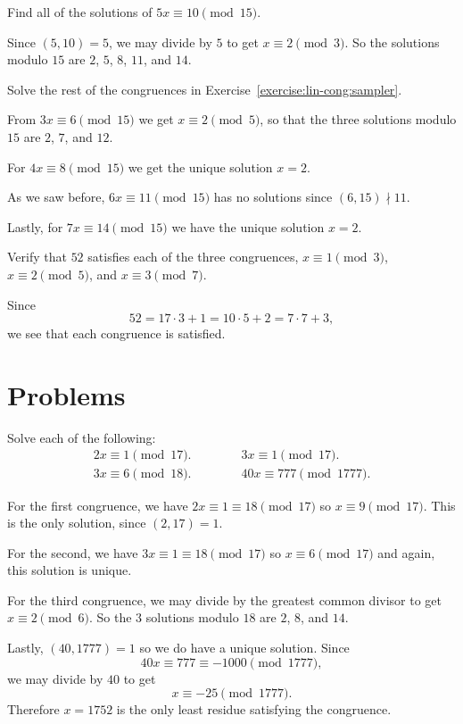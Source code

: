  Find all of the solutions of $5x\equiv10\pmod{15}$.
\begin{solution}
  Since $(5,10) = 5$, we may divide by $5$ to get $x\equiv2\pmod3$. So
  the solutions modulo $15$ are $2$, $5$, $8$, $11$, and $14$.
\end{solution}

 Solve the rest of the congruences in
Exercise~\ref{exercise:lin-cong:sampler}.
\begin{solution}
  From $3x\equiv6\pmod{15}$ we get $x\equiv2\pmod{5}$, so that the
  three solutions modulo $15$ are $2$, $7$, and $12$.

  For $4x\equiv8\pmod{15}$ we get the unique solution $x = 2$.

  As we saw before, $6x\equiv11\pmod{15}$ has no solutions since
  $(6,15)\nmid11$.

  Lastly, for $7x\equiv14\pmod{15}$ we have the unique solution
  $x = 2$.
\end{solution}

 Verify that $52$ satisfies each of the three congruences,
$x\equiv1\pmod3$, $x\equiv2\pmod5$, and $x\equiv3\pmod7$.
\begin{solution}
  Since
  \begin{equation*}
    52 = 17\cdot3 + 1 = 10\cdot5 + 2 = 7\cdot7 + 3,
  \end{equation*}
  we see that each congruence is satisfied.
\end{solution}

\section{Problems}

 Solve each of the following:
\begin{gather*}
  2x\equiv1\pmod{17}. \qquad\qquad 3x\equiv1\pmod{17}. \\
  3x\equiv6\pmod{18}. \qquad\qquad 40x\equiv777\pmod{1777}.
\end{gather*}
\begin{solution}
  For the first congruence, we have $2x\equiv1\equiv18\pmod{17}$ so
  $x\equiv9\pmod{17}$. This is the only solution, since $(2,17) = 1$.

  For the second, we have $3x\equiv1\equiv18\pmod{17}$ so
  $x\equiv6\pmod{17}$ and again, this solution is unique.

  For the third congruence, we may divide by the greatest common
  divisor to get $x\equiv2\pmod6$. So the $3$ solutions modulo $18$
  are $2$, $8$, and $14$.

  Lastly, $(40,1777) = 1$ so we do have a unique solution. Since
  \begin{equation*}
    40x\equiv777\equiv-1000\pmod{1777},
  \end{equation*}
  we may divide by $40$ to get
  \begin{equation*}
    x\equiv-25\pmod{1777}.
  \end{equation*}
  Therefore $x = 1752$ is the only least residue satisfying the
  congruence.
\end{solution}

